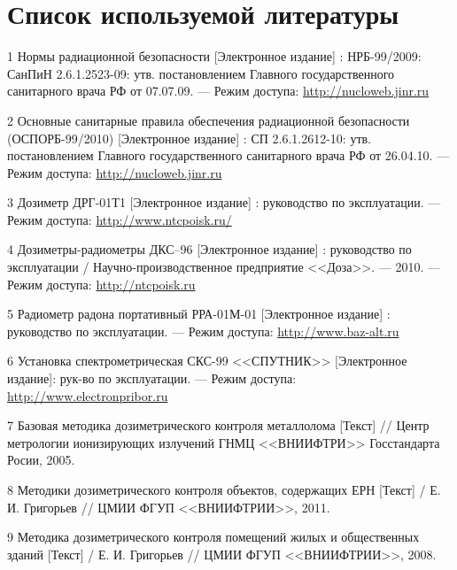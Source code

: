 \chapter{Список используемой литературы}
    1 Нормы радиационной безопасности [Электронное издание] : 
        НРБ-99/2009: СанПиН 2.6.1.2523-09: утв. постановлением 
        Главного государственного санитарного врача РФ 
        от 07.07.09. --- Режим доступа: 
        \href{http://nucloweb.jinr.ru/nucloserv/inform/instructions/nrb-99-2009.pdf}
        {http://nucloweb.jinr.ru}

    2 Основные санитарные правила обеспечения радиационной безопасности
         (ОСПОРБ-99/2010) [Электронное издание] : СП 2.6.1.2612-10: утв. 
        постановлением Главного государственного санитарного врача РФ 
        от 26.04.10. --- Режим доступа: 
        \href{http://nucloweb.jinr.ru/nucloserv/inform/instructions/osprb-99-2010.pdf}
        {http://nucloweb.jinr.ru}

    3 Дозиметр ДРГ-01Т1 [Электронное издание] : руководство по 
        эксплуатации. --- Режим доступа: 
        \href{http://www.ntcpoisk.ru/}{http://www.ntcpoisk.ru/}

    4 Дозиметры-радиометры ДКС–96 [Электронное издание] : руководство по 
        эксплуатации / Научно-производственное предприятие <<Доза>>. --- 
        2010. --- Режим доступа: 
        \href{http://ntcpoisk.ru/d/350762/d/dozimetri_radiometridks96.pdf}
        {http://ntcpoisk.ru}  

    5 Радиометр радона портативный РРА-01М-01 [Электронное издание] : 
        руководство по эксплуатации. --- Режим доступа: 
        \href{http://www.baz-alt.ru/userfiles/files/sks.pdf}
        {http://www.baz-alt.ru}  

    6 Установка спектрометрическая СКС-99 <<СПУТНИК>> [Электронное издание]: 
        рук-во по эксплуатации. --- Режим доступа: 
        \href{http://www.electronpribor.ru/resources/docs/RE_PPA_01_01ispr.pdf}
        {http://www.electronpribor.ru}

    7 Базовая методика дозиметрического контроля металлолома [Текст] // 
        Центр метрологии ионизирующих излучений ГНМЦ <<ВНИИФТРИ>> 
        Госстандарта Росии, 2005.
    
    8 Методики дозиметрического контроля объектов, содержащих ЕРН [Текст] / 
        Е. И. Григорьев // ЦМИИ ФГУП <<ВНИИФТРИИ>>, 2011. 

    9 Методика дозиметрического контроля помещений жилых и общественных 
        зданий [Текст] / Е. И. Григорьев // ЦМИИ ФГУП <<ВНИИФТРИИ>>, 2008.

